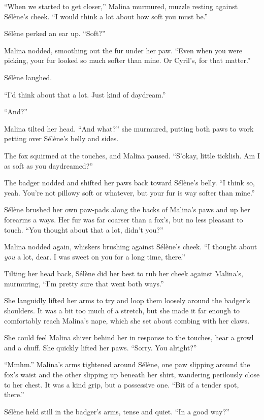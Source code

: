 ``When we started to get closer,'' Malina murmured, muzzle resting against Sélène's cheek. ``I would think a lot about how soft you must be.''

Sélène perked an ear up. ``Soft?''

Malina nodded, smoothing out the fur under her paw. ``Even when you were picking, your fur looked so much softer than mine. Or Cyril's, for that matter.''

Sélène laughed.

``I'd think about that a lot. Just kind of daydream.''

``And?''

Malina tilted her head. ``And what?'' she murmured, putting both paws to work petting over Sélène's belly and sides.

The fox squirmed at the touches, and Malina paused. ``S'okay, little ticklish. Am I as soft as you daydreamed?''

The badger nodded and shifted her paws back toward Sélène's belly. ``I think so, yeah. You're not pillowy soft or whatever, but your fur is way softer than mine.''

Sélène brushed her own paw-pads along the backs of Malina's paws and up her forearms a ways. Her fur was far coarser than a fox's, but no less pleasant to touch. ``You thought about that a lot, didn't you?''

Malina nodded again, whiskers brushing against Sélène's cheek. ``I thought about \emph{you} a lot, dear. I was sweet on you for a long time, there.''

Tilting her head back, Sélène did her best to rub her cheek against Malina's, murmuring, ``I'm pretty sure that went both ways.''

She languidly lifted her arms to try and loop them loosely around the badger's shoulders. It was a bit too much of a stretch, but she made it far enough to comfortably reach Malina's nape, which she set about combing with her claws.

She could feel Malina shiver behind her in response to the touches, hear a growl and a chuff. She quickly lifted her paws. ``Sorry. You alright?''

``Mmhm.'' Malina's arms tightened around Sélène, one paw slipping around the fox's waist and the other slipping up beneath her shirt, wandering perilously close to her chest. It was a kind grip, but a possessive one. ``Bit of a tender spot, there.''

Sélène held still in the badger's arms, tense and quiet. ``In a good way?''

